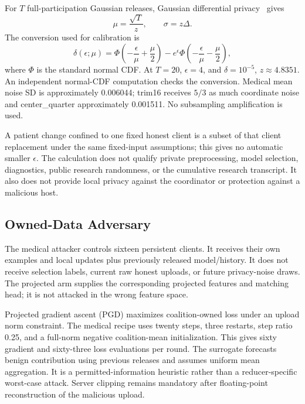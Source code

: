 \documentclass[conference,letterpaper]{IEEEtran}
\begin{document}
For $T$ full-participation Gaussian releases, Gaussian differential privacy~\cite{gdp} gives
\begin{equation}
\mu=\frac{\sqrt{T}}{z},\qquad \sigma=z\Delta.
\label{eq:gdp}
\end{equation}
The conversion used for calibration is
\begin{equation}
\delta(\epsilon;\mu)=\Phi\!\left(-\frac{\epsilon}{\mu}+\frac{\mu}{2}\right)
-e^{\epsilon}\Phi\!\left(-\frac{\epsilon}{\mu}-\frac{\mu}{2}\right),
\end{equation}
where $\Phi$ is the standard normal CDF. At $T=20$, $\epsilon=4$, and $\delta=10^{-5}$, $z\approx4.8351$. An independent normal-CDF computation checks the conversion. Medical mean noise SD is approximately 0.006044; trim16 receives $5/3$ as much coordinate noise and center\_quarter approximately 0.001511. No subsampling amplification is used.

A patient change confined to one fixed honest client is a subset of that client replacement under the same fixed-input assumptions; this gives no automatic smaller $\epsilon$. The calculation does not qualify private preprocessing, model selection, diagnostics, public research randomness, or the cumulative research transcript. It also does not provide local privacy against the coordinator or protection against a malicious host.

\subsection{Owned-Data Adversary}
The medical attacker controls sixteen persistent clients. It receives their own examples and local updates plus previously released model/history. It does not receive selection labels, current raw honest uploads, or future privacy-noise draws. The projected arm supplies the corresponding projected features and matching head; it is not attacked in the wrong feature space.

Projected gradient ascent (PGD) maximizes coalition-owned loss under an upload norm constraint. The medical recipe uses twenty steps, three restarts, step ratio 0.25, and a full-norm negative coalition-mean initialization. This gives sixty gradient and sixty-three loss evaluations per round. The surrogate forecasts benign contribution using previous releases and assumes uniform mean aggregation. It is a permitted-information heuristic rather than a reducer-specific worst-case attack. Server clipping remains mandatory after floating-point reconstruction of the malicious upload.
\end{document}
